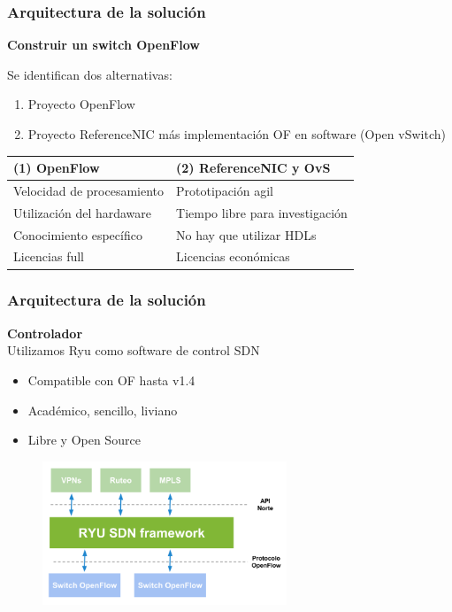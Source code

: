 \documentclass{beamer}
\begin{document}
\begin{frame}
\frametitle{Arquitectura de la soluci\'on} 

\textbf{Construir un switch OpenFlow} 

\vspace{0.3cm}
Se identifican dos alternativas: 
\begin{enumerate}
\item Proyecto OpenFlow
\item Proyecto ReferenceNIC m\'as implementaci\'on OF en software (Open vSwitch)
\end{enumerate}

\begin{table}[]
\small
\centering
\label{label}
\begin{tabular}{| p{5cm} | p{5cm} |}

\hline
\multicolumn{1}{|l|}{(1) OpenFlow } & \multicolumn{1}{l|}{(2) ReferenceNIC y OvS } \\
\hline
Velocidad de procesamiento & Prototipaci\'on agil \\
Utilizaci\'on del hardaware &  Tiempo libre para investigaci\'on \\
Conocimiento espec\'ifico &  No hay que utilizar HDLs \\
Licencias full &  Licencias econ\'omicas \\

\hline  
\end{tabular}
\end{table}
\end{frame}

\begin{frame}
\frametitle{Arquitectura de la soluci\'on} 

\textbf{Controlador} \\
Utilizamos Ryu como software de control SDN

\begin{itemize}
\item Compatible con OF hasta v1.4
\item Acad\'emico, sencillo, liviano
\item Libre y Open Source
\end{itemize}

\begin{figure}[H]
\centering
\includegraphics[width=0.65\textwidth]{imagenes/ryuarch.png}
\end{figure}

\end{frame}
\end{document}
